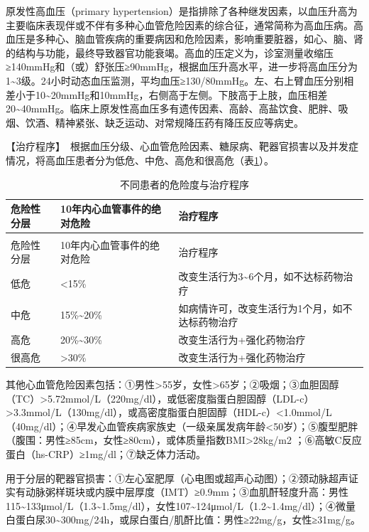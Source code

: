 原发性高血压（primary
hypertension）是指排除了各种继发因素，以血压升高为主要临床表现伴或不伴有多种心血管危险因素的综合征，通常简称为高血压病。高血压是多种心、脑血管疾病的重要病因和危险因素，影响重要脏器，如心、脑、肾的结构与功能，最终导致器官功能衰竭。高血的压定义为，诊室测量收缩压≥140mmHg和（或）舒张压≥90mmHg，根据血压升高水平，进一步将高血压分为1\textasciitilde{}3级。24小时动态血压监测，平均血压≥130/80mmHg。左、右上臂血压分别相差小于10\textasciitilde{}20mmHg和10mmHg，右侧高于左侧。下肢高于上肢，血压相差20\textasciitilde{}40mmHg。临床上原发性高血压多有遗传因素、高龄、高盐饮食、肥胖、吸烟、饮酒、精神紧张、缺乏运动、对常规降压药有降压反应等病史。

【治疗程序】　根据血压分级、心血管危险因素、糖尿病、靶器官损害以及并发症情况，将高血压患者分为低危、中危、高危和很高危（表\ref{tab2-7-1}）。

\begin{longtable}[]{@{}lll@{}}
    \caption{不同患者的危险度与治疗程序}
    \label{tab2-7-1}\\
\toprule
危险性分层 & 10年内心血管事件的绝对危险 & 治疗程序\tabularnewline
\midrule
\endfirsthead
\caption[]{不同患者的危险度与治疗程序}\\
\toprule
危险性分层 & 10年内心血管事件的绝对危险 & 治疗程序\tabularnewline
\midrule
\endhead
\bottomrule
\endfoot
低危 & \textless{}15\% &
改变生活行为3\textasciitilde{}6个月，如不达标药物治疗\tabularnewline
中危 & 15\%\textasciitilde{}20\% &
如病情许可，改变生活行为1个月，如不达标药物治疗\tabularnewline
高危 & 20\%\textasciitilde{}30\% &
改变生活行为+强化药物治疗\tabularnewline
很高危 & \textgreater{}30\% & 改变生活行为+强化药物治疗\tabularnewline
\end{longtable}

其他心血管危险因素包括：①男性\textgreater{}55岁，女性\textgreater{}65岁；②吸烟；③血胆固醇（TC）\textgreater{}5.72mmol/L（220mg/dl），或低密度脂蛋白胆固醇（LDL-c）\textgreater{}3.3mmol/L（130mg/dl），或高密度脂蛋白胆固醇（HDL-c）\textless{}1.0mmol/L（40mg/dl）；④早发心血管疾病家族史（一级亲属发病年龄\textless{}50岁）；⑤腹型肥胖（腹围：男性≥85cm，女性≥80cm），或体质量指数BMI\textgreater{}28kg/m{2}
；⑥高敏C反应蛋白（hs-CRP）≥1mg/dl；⑦缺乏体力活动。

用于分层的靶器官损害：①左心室肥厚（心电图或超声心动图）；②颈动脉超声证实有动脉粥样斑块或内膜中层厚度（IMT）≥0.9mm；③血肌酐轻度升高：男性115\textasciitilde{}133μmol/L（1.3\textasciitilde{}1.5mg/dl），女性107\textasciitilde{}124μmol/L（1.2\textasciitilde{}1.4mg/dl）；④微量白蛋白尿30\textasciitilde{}300mg/24h，或尿白蛋白/肌酐比值：男性≥22mg/g，女性≥31mg/g。

